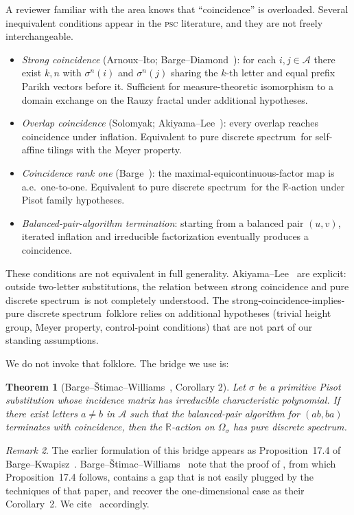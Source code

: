 \documentclass[11pt]{article}
\theoremstyle{plain}
\newtheorem{theorem}{Theorem}[section]
\theoremstyle{definition}
\theoremstyle{remark}
\newtheorem{remark}[theorem]{Remark}
\newcommand{\PSC}{\textsc{psc}}
\newcommand{\PDS}{pure discrete spectrum}
\newcommand{\R}{\mathbb{R}}
\newcommand{\A}{\mathcal{A}}
\begin{document}
A reviewer familiar with the area knows that ``coincidence'' is overloaded. Several inequivalent conditions appear in the \PSC{} literature, and they are not freely interchangeable.
\begin{itemize}[leftmargin=*]
\item \emph{Strong coincidence} (Arnoux--Ito; Barge--Diamond~\cite{BD}): for each $i,j\in\A$ there exist $k,n$ with $\sigma^n(i)$ and $\sigma^n(j)$ sharing the $k$-th letter and equal prefix Parikh vectors before it. Sufficient for measure-theoretic isomorphism to a domain exchange on the Rauzy fractal under additional hypotheses.
\item \emph{Overlap coincidence} (Solomyak; Akiyama--Lee~\cite{AL}): every overlap reaches coincidence under inflation. Equivalent to \PDS\ for self-affine tilings with the Meyer property.
\item \emph{Coincidence rank one} (Barge~\cite{Barge2016}): the maximal-equicontinuous-factor map is a.e.\ one-to-one. Equivalent to \PDS\ for the $\R$-action under Pisot family hypotheses.
\item \emph{Balanced-pair-algorithm termination}: starting from a balanced pair $(u,v)$, iterated inflation and irreducible factorization eventually produces a coincidence.
\end{itemize}

These conditions are not equivalent in full generality. Akiyama--Lee~\cite{AkiyamaLee2014} are explicit: outside two-letter substitutions, the relation between strong coincidence and \PDS\ is not completely understood. The strong-coincidence-implies-\PDS\ folklore relies on additional hypotheses (trivial height group, Meyer property, control-point conditions) that are not part of our standing assumptions.

We do not invoke that folklore. The bridge we use is:

\begin{theorem}[Barge--\v{S}timac--Williams~\cite{BSW}, Corollary 2]\label{thm:BSW}
Let $\sigma$ be a primitive Pisot substitution whose incidence matrix has irreducible characteristic polynomial. If there exist letters $a\ne b$ in $\A$ such that the balanced-pair algorithm for $(ab,ba)$ terminates with coincidence, then the $\R$-action on $\Omega_\sigma$ has \PDS.
\end{theorem}

\begin{remark}\label{rem:BK-gap}
The earlier formulation of this bridge appears as Proposition~17.4 of Barge--Kwapisz~\cite{BK}. Barge--\v{S}timac--Williams~\cite[\S 1]{BSW} note that the proof of \cite[Theorem 16.3]{BK}, from which Proposition~17.4 follows, contains a gap that is not easily plugged by the techniques of that paper, and recover the one-dimensional case as their Corollary~2. We cite~\cite{BSW} accordingly.
\end{remark}
\end{document}
